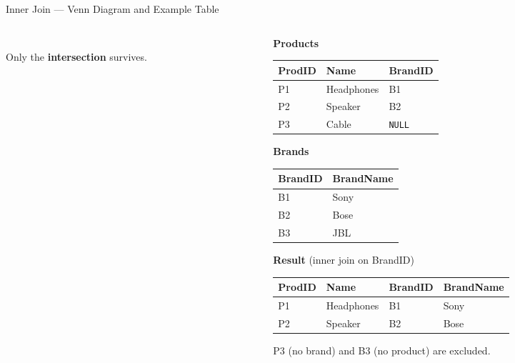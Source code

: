 \begin{frame}{Inner Join --- Venn Diagram and Example Table}
  \begin{columns}[c]
    \begin{column}{0.3\textwidth}
      \centering
      \\[4pt]
      \small Only the \textbf{intersection} survives.
    \end{column}
    \begin{column}{0.65\textwidth}
      \small
      \textbf{Products}
      \begin{tabular}{lll}
        \toprule
        \textbf{ProdID} & \textbf{Name} & \textbf{BrandID}\\
        \midrule
        P1 & Headphones & B1 \\
        P2 & Speaker    & B2 \\
        P3 & Cable      & \texttt{NULL} \\
        \bottomrule
      \end{tabular}

      \vspace{6pt}
      \textbf{Brands}
      \begin{tabular}{ll}
        \toprule
        \textbf{BrandID} & \textbf{BrandName}\\
        \midrule
        B1 & Sony \\
        B2 & Bose \\
        B3 & JBL  \\
        \bottomrule
      \end{tabular}

      \vspace{6pt}
      \textbf{Result} (inner join on BrandID)
      \begin{tabular}{llll}
        \toprule
        ProdID & Name & BrandID & BrandName\\
        \midrule
        P1 & Headphones & B1 & Sony \\
        P2 & Speaker    & B2 & Bose \\
        \bottomrule
      \end{tabular}
      \small P3 (no brand) and B3 (no product) are excluded.
    \end{column}
  \end{columns}
\end{frame}

